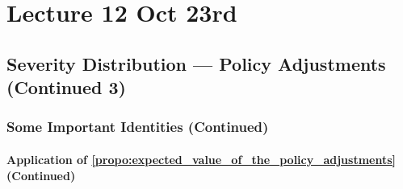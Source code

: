 \documentclass[notoc,notitlepage]{tufte-book}
\begin{document}




\chapter{Lecture 12 Oct 23rd}%
\label{chp:lecture_12_oct_23rd}

\section{Severity Distribution --- Policy Adjustments (Continued 3)}%
\label{sec:severity_distribution_policy_adjustments_continued_3}

\subsection{Some Important Identities (Continued)}%
\label{sub:some_important_identities_continued}

\subsubsection{Application of \cref{propo:expected_value_of_the_policy_adjustments} (Continued)}%
\label{ssub:application_of_expected_value_of_the_policy_adjustments_continued}
\end{document}

